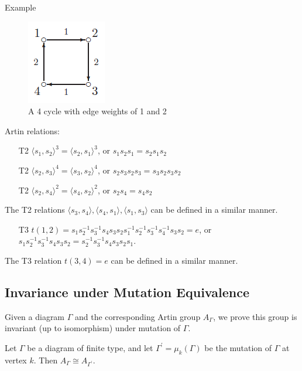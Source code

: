 \documentclass{beamer}
\begin{document}
\begin{frame}{Example}
\begin{figure}
\centering
\includegraphics[scale=.5]{4cycle.PNG}
\caption{A 4 cycle with edge weights of 1 and 2}
\end{figure}

\small
Artin relations:
\begin{itemize}
\item[T2] $\langle s_1, s_2 \rangle ^3 = \langle s_2, s_1 \rangle ^3$, or $s_1s_2s_1 = s_2s_1s_2$
\item[T2] $\langle s_2, s_3 \rangle ^4 = \langle s_3, s_2 \rangle ^4$, or $s_2s_3s_2s_3 = s_3s_2s_3s_2$
\item[T2] $\langle s_2, s_4 \rangle ^2 = \langle s_4, s_2 \rangle ^2$, or $s_2s_4 = s_4s_2$
\end{itemize}
The T2 relations $\langle s_3, s_4 \rangle, \langle s_4, s_1 \rangle, \langle s_1, s_3 \rangle$ can be defined in a similar manner.
\begin{itemize}
\item[T3] $t(1,2) = s_1s_2^{-1}s_3^{-1}s_4s_3s_2s_1^{-1}s_2^{-1}s_3^{-1}s_4^{-1}s_3s_2 = e$, or $s_1s_2^{-1}s_3^{-1}s_4s_3s_2 = s_2^{-1}s_3^{-1}s_4s_3s_2s_1$.
\end{itemize}

The T3 relation $t(3,4) = e$ can be defined in a similar manner.
\end{frame}



\subsection{Invariance under Mutation Equivalence}

\begin{frame}
Given a diagram $\Gamma$ and the corresponding Artin group $A_{\Gamma}$, we prove this group is invariant (up to isomorphism) under mutation of $\Gamma$.

\begin{theorem}
Let $\Gamma$ be a diagram of finite type, and let $\Gamma^{\prime} = \mu_k(\Gamma)$ be the mutation of $\Gamma$ at vertex $k$. Then $A_{\Gamma} \cong A_{\Gamma^{\prime}}$.
\end{theorem}
\end{frame}
\end{document}
